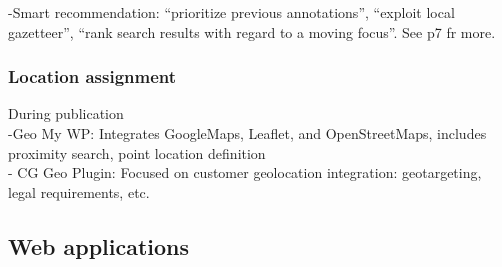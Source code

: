 -{\color{red}Smart recommendation: “prioritize previous annotations”, “exploit local gazetteer”, “rank search results with regard to a moving focus”. See p7 fr more.\cite{Cai2016}}\\

\subsubsection{Location assignment}
During publication\\
-Geo My WP: {\color{orange} Integrates GoogleMaps, Leaflet, and OpenStreetMaps, includes proximity search, point location definition \cite{Fitoussi}}\\
- CG Geo Plugin: {\color{orange}  Focused on customer geolocation integration: geotargeting, legal requirements, etc. \cite{CFGeoPlugin}}\\

\subsection{Web applications}
